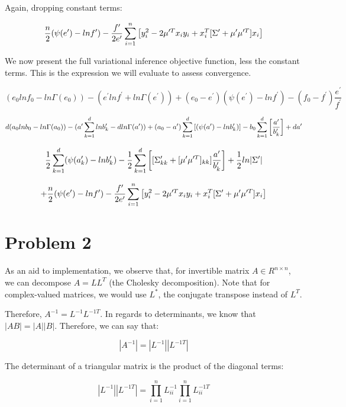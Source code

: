 \documentclass[twoside,11pt]{homework}
\begin{document}
Again, dropping constant terms:

\begin{equation}
\frac{n}{2}(\psi(e^\prime) - lnf^\prime)
- \frac{f^\prime}{2e^\prime} \sum_{i=1}^n \left[y_i^2 - 2\mu^{\prime T}x_iy_i + x_i^T [\Sigma^\prime + \mu^\prime \mu^{\prime T}]x_i\right]
\end{equation}

We now present the full variational inference objective function, less the constant terms. This is the expression we will evaluate to assess convergence.

\[
(e_0lnf_0 - ln\Gamma(e_0)) - (e^\prime lnf^\prime + ln\Gamma(e^\prime))
+ (e_0 - e^\prime)(\psi(e^\prime) - lnf^\prime)
- (f_0 - f^\prime)\frac{e^\prime}{f^\prime}
\]

\[
d(a_0lnb_0 - ln\Gamma(a_0)) - (a^\prime \sum_{k=1}^d lnb^\prime_k - dln\Gamma(a^\prime))
+ (a_0 - a^\prime)\sum_{k=1}^d \left[(\psi(a^\prime) - lnb^\prime_k)\right]
- b_0\sum_{k=1}^d \left[\frac{a^\prime}{b^\prime_k}\right] + da^\prime
\]

\[
 \frac{1}{2}\sum_{k=1}^d (\psi(a^\prime_k) - lnb^\prime_k)
 - \frac{1}{2}\sum_{k=1}^d \left[[\Sigma^\prime_{kk} + [\mu^\prime \mu^{\prime T}]_{kk}]\frac{a^\prime}{b^\prime_k}\right]
+ \frac{1}{2}ln|\Sigma^\prime|
\]

\begin{equation}
+ \frac{n}{2}(\psi(e^\prime) - lnf^\prime)
- \frac{f^\prime}{2e^\prime} \sum_{i=1}^n \left[y_i^2 - 2\mu^{\prime T}x_iy_i + x_i^T [\Sigma^\prime + \mu^\prime \mu^{\prime T}]x_i\right]
\end{equation}

\section*{Problem 2}

As an aid to implementation, we observe that, for invertible matrix $A \in R^{n \times n}$, we can decompose $A = LL^T$ (the Cholesky decomposition).
Note that for complex-valued matrices, we would use $L^*$, the conjugate transpose instead of $L^T$.

Therefore, $A^{-1} = L^{-1}L^{-1T}$. In regards to determinants, we know that $|AB| = |A||B|$. Therefore, we can say that:

\[
|A^{-1}| = |L^{-1}||L^{-1T}|
\]

The determinant of a triangular matrix is the product of the diagonal terms:

\[
|L^{-1}||L^{-1T}| = \prod_{i=1}^n L^{-1}_{ii}    \prod_{i=1}^n L^{-1T}_{ii}
\]
\end{document}
